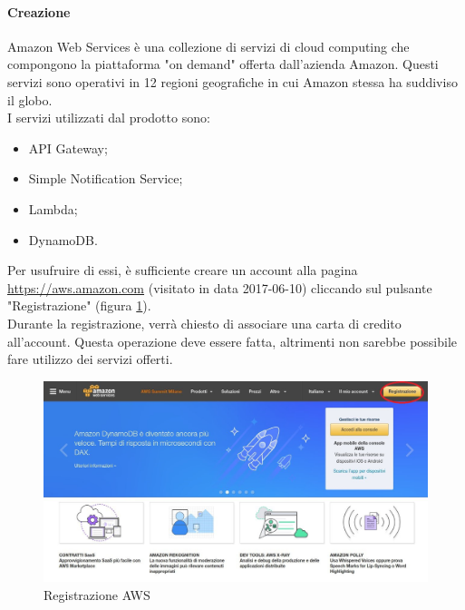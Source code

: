 \paragraph{Creazione}
Amazon Web Services è una collezione di servizi di cloud computing che compongono la piattaforma "on demand" offerta dall'azienda Amazon. Questi servizi sono operativi in 12 regioni geografiche in cui Amazon stessa ha suddiviso il globo.\\
I servizi utilizzati dal prodotto sono:
\begin{itemize}
	\item API Gateway;
	\item Simple Notification Service;
	\item Lambda;
	\item DynamoDB.
\end{itemize}
Per usufruire di essi, è sufficiente creare un account alla pagina \url{https://aws.amazon.com} (visitato in data 2017-06-10) cliccando sul pulsante "Registrazione" (figura \ref{fig:aws}). \\
Durante la registrazione, verrà chiesto di associare una carta di credito all'account. Questa operazione deve essere fatta, altrimenti non sarebbe possibile fare utilizzo dei servizi offerti.
\begin{figure}[H]
\includegraphics[width=\textwidth,height=\textheight,keepaspectratio]{sezioni/images/aws.jpg}
\caption{Registrazione AWS}\label{fig:aws}
\end{figure}
\newpage

